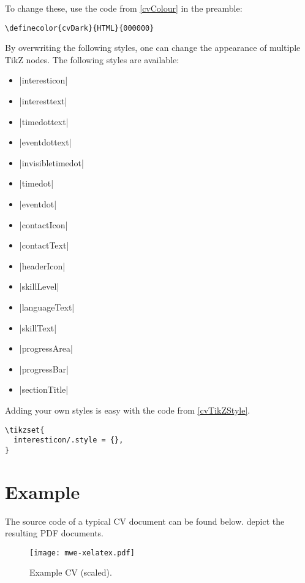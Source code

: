 \documentclass{ltxdoc}
\begin{document}
  To change these, use the code from \cref{cvColour} in the preamble:
  
  \begin{lstlisting}[caption={Colour editing.},label=cvColour]
\definecolor{cvDark}{HTML}{000000}
  \end{lstlisting}
  
  By overwriting the following styles, one can change the appearance of multiple TikZ nodes. The following styles are available:
  \begin{itemize}
    \item |interesticon|
    \item |interesttext|
    \item |timedottext|
    \item |eventdottext|
    \item |invisibletimedot|
    \item |timedot|
    \item |eventdot|
    \item |contactIcon|
    \item |contactText|
    \item |headerIcon|
    \item |skillLevel|
    \item |languageText|
    \item |skillText|
    \item |progressArea|
    \item |progressBar|
    \item |sectionTitle|
  \end{itemize}
  
  Adding your own styles is easy with the code from \cref{cvTikZStyle}.
  
  \begin{lstlisting}[caption={Change TikZ style.},label=cvTikZStyle]
\tikzset{
  interesticon/.style = {},
}
  \end{lstlisting}
  
  
\section{Example}

  The source code of a typical CV document can be found below.  depict the resulting PDF documents.

  \begin{figure}[!ht]
    \texttt{[image: mwe-xelatex.pdf]}
    \caption{Example CV (scaled).}
    \label{example-cv}
  \end{figure}
\end{document}
